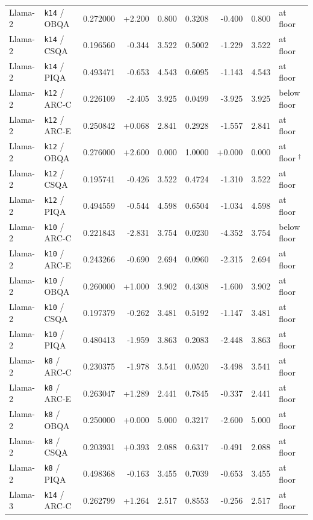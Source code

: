{\begin{longtable}{@{}llrrrrrrl@{}}
Llama-2 & \texttt{k14} / OBQA & 0.272000 & +2.200 & 0.800 & 0.3208 & -0.400 & 0.800 & at floor \\
Llama-2 & \texttt{k14} / CSQA & 0.196560 & -0.344 & 3.522 & 0.5002 & -1.229 & 3.522 & at floor \\
Llama-2 & \texttt{k14} / PIQA & 0.493471 & -0.653 & 4.543 & 0.6095 & -1.143 & 4.543 & at floor \\
\midrule
Llama-2 & \texttt{k12} / ARC-C & 0.226109 & -2.405 & 3.925 & 0.0499 & -3.925 & 3.925 & below floor \\
Llama-2 & \texttt{k12} / ARC-E & 0.250842 & +0.068 & 2.841 & 0.2928 & -1.557 & 2.841 & at floor \\
Llama-2 & \texttt{k12} / OBQA & 0.276000 & +2.600 & 0.000 & 1.0000 & +0.000 & 0.000 & at floor $^{\ddagger}$ \\
Llama-2 & \texttt{k12} / CSQA & 0.195741 & -0.426 & 3.522 & 0.4724 & -1.310 & 3.522 & at floor \\
Llama-2 & \texttt{k12} / PIQA & 0.494559 & -0.544 & 4.598 & 0.6504 & -1.034 & 4.598 & at floor \\
\midrule
Llama-2 & \texttt{k10} / ARC-C & 0.221843 & -2.831 & 3.754 & 0.0230 & -4.352 & 3.754 & below floor \\
Llama-2 & \texttt{k10} / ARC-E & 0.243266 & -0.690 & 2.694 & 0.0960 & -2.315 & 2.694 & at floor \\
Llama-2 & \texttt{k10} / OBQA & 0.260000 & +1.000 & 3.902 & 0.4308 & -1.600 & 3.902 & at floor \\
Llama-2 & \texttt{k10} / CSQA & 0.197379 & -0.262 & 3.481 & 0.5192 & -1.147 & 3.481 & at floor \\
Llama-2 & \texttt{k10} / PIQA & 0.480413 & -1.959 & 3.863 & 0.2083 & -2.448 & 3.863 & at floor \\
\midrule
Llama-2 & \texttt{k8} / ARC-C & 0.230375 & -1.978 & 3.541 & 0.0520 & -3.498 & 3.541 & at floor \\
Llama-2 & \texttt{k8} / ARC-E & 0.263047 & +1.289 & 2.441 & 0.7845 & -0.337 & 2.441 & at floor \\
Llama-2 & \texttt{k8} / OBQA & 0.250000 & +0.000 & 5.000 & 0.3217 & -2.600 & 5.000 & at floor \\
Llama-2 & \texttt{k8} / CSQA & 0.203931 & +0.393 & 2.088 & 0.6317 & -0.491 & 2.088 & at floor \\
Llama-2 & \texttt{k8} / PIQA & 0.498368 & -0.163 & 3.455 & 0.7039 & -0.653 & 3.455 & at floor \\
\midrule
Llama-3 & \texttt{k14} / ARC-C & 0.262799 & +1.264 & 2.517 & 0.8553 & -0.256 & 2.517 & at floor \\

\end{longtable}}
